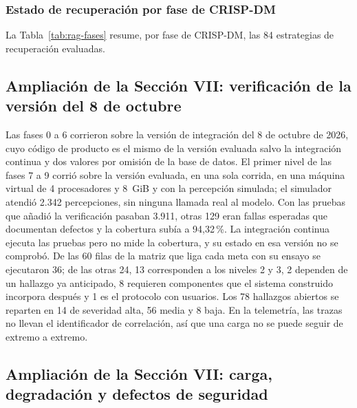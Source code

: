 \subsubsection{Estado de recuperación por fase de CRISP-DM}

La Tabla~\ref{tab:rag-fases} resume, por fase de CRISP-DM, las 84 estrategias de recuperación evaluadas.



\subsection*{Ampliación de la Sección VII: verificación de la versión del 8 de octubre}

Las fases 0 a 6 corrieron sobre la versión de integración del 8 de octubre de 2026, cuyo código de
producto es el mismo de la versión evaluada salvo la integración continua y dos valores por omisión
de la base de datos. El primer nivel de las fases 7 a 9 corrió sobre la versión evaluada, en una
sola corrida, en una máquina virtual de 4 procesadores y 8~GiB y con la percepción simulada; el
simulador atendió 2.342 percepciones, sin ninguna llamada real al modelo. Con las pruebas que añadió
la verificación pasaban 3.911, otras 129 eran fallas esperadas que documentan defectos y la
cobertura subía a 94,32\,\%. La integración continua ejecuta las pruebas pero no mide la cobertura,
y su estado en esa versión no se comprobó. De las 60 filas de la matriz que liga cada meta con su
ensayo se ejecutaron 36; de las otras 24, 13 corresponden a los niveles 2 y 3, 2 dependen de un
hallazgo ya anticipado, 8 requieren componentes que el sistema construido incorpora después y 1 es
el protocolo con usuarios. Los 78 hallazgos abiertos se reparten en 14 de severidad alta, 56 media
y 8 baja. En la telemetría, las trazas no llevan el identificador de correlación, así que una carga
no se puede seguir de extremo a extremo.

\subsection*{Ampliación de la Sección VII: carga, degradación y defectos de seguridad}

